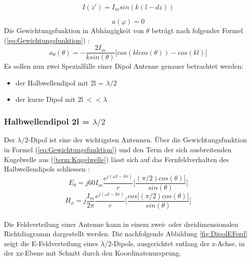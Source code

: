 \begin{equation}
I(z')=I_{m}sin(k(l-dz))
\end{equation}

\begin{equation}
a(\varphi)= 0
\end{equation}
Die Gewichtungsfunktion in Abhängigkeit von $\theta$ beträgt nach folgender Formel (\ref{eq:Gewichtungsfunktion}) \cite{elliott1981antenna}:
\begin{equation}\label{eq:Gewichtungsfunktion}
a_{\theta}(\theta)=- \frac{2I_{m}}{k sin(\theta)} \Big\lbrack cos(kl cos(\theta)) - cos(kl) \Big\rbrack
\end{equation}
Es sollen nun zwei Spezialfälle einer Dipol Antenne genauer betrachtet werden:
\begin{itemize}
\item der Halbwellendipol mit 2l = $\lambda/2$
\item der kurze Dipol mit 2l$ \ <<\lambda$
\end{itemize}
\newpage
\subsubsection{Halbwellendipol 2l = $\lambda/2$}
Der $\lambda/2$-Dipol ist eine der wichtigsten Antennen. Über die Gewichtungsfunktion in Formel (\ref{eq:Gewichtungsfunktion}) und den Term der sich ausbreitenden Kugelwelle aus (\ref{term:Kugelwelle}) lässt sich auf das Fernfeldverhalten des Halbwellendipols schliessen \cite{elliott1981antenna}:\\
\begin{equation}
E_{\theta}=j60I_{m} \frac{e^{j(\omega t - kr)}}{r} \biggl\lbrack \frac{  (\pi/2) cos(\theta)\rbrack}{sin(\theta)} \biggr\rbrack
\end{equation}
\begin{equation}
H_{\phi}=j \frac{I_{m}}{2\pi} \frac{e^{j(\omega t - kr)}}{r} \biggl\lbrack \frac{cos\lbrack  (\pi/2) cos(\theta)\rbrack}{sin(\theta)} \biggr\rbrack
\end{equation}\\
Die Feldverteilung einer Antenne kann in einem zwei- oder dreidimensionalen Richtdiagramm dargestellt werden. Die nachfolgende Abbildung \ref{fig:DipolEFerd} zeigt die E-Feldverteilung eines $\lambda/2$-Dipols, ausgerichtet entlang der z-Achse, in der xz-Ebene mit Schnitt durch den Koordinatenursprung.\\



